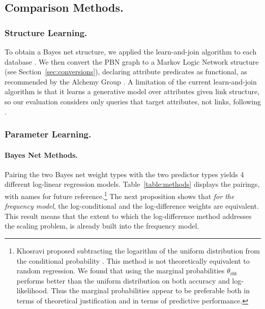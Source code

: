 \documentclass[twoside,leqno,twocolumn]{article}
\begin{document}
\subsection{Comparison Methods.}

\subsubsection{Structure Learning.} To obtain a Bayes net structure, we applied the learn-and-join algorithm to each database %
\cite{Schulte2012}. 
We then convert the PBN graph to a Markov Logic Network structure (see Section~\ref{sec:conversions}),
declaring attribute predicates as functional, as recommended by the Alchemy Group \cite{bib:bayes-convert}. A limitation of the current learn-and-join algorithm is that it learns a generative model over attributes given link structure, so our evaluation considers only queries that target attributes, not links, following \cite{Khosravi2010,Schulte2012}. 

\subsubsection{Parameter Learning.} 
\paragraph{Bayes Net Methods.}
Pairing the two Bayes net weight types with the two predictor types yields 4 different log-linear regression models. Table~\ref{table:methods} displays the pairings, with names for future reference.\footnote{Khosravi proposed subtracting the logarithm of the uniform distribution from the conditional probability \cite{Khosravi2012b}.
 This method is not theoretically equivalent to random regression. We found that using the marginal probabilities $\theta_{i0k}$ performs better than the uniform distribution on both accuracy and log-likelihood. Thus the marginal probabilities appear to be preferable both in terms of theoretical justification and in terms of predictive performance.} 
%
The next proposition shows that {\em for the frequency model},   the log-conditional and the log-difference weights are equivalent. 
This result means that the extent to which the log-difference method addresses the scaling problem, is already built into the frequency model.
\end{document}
